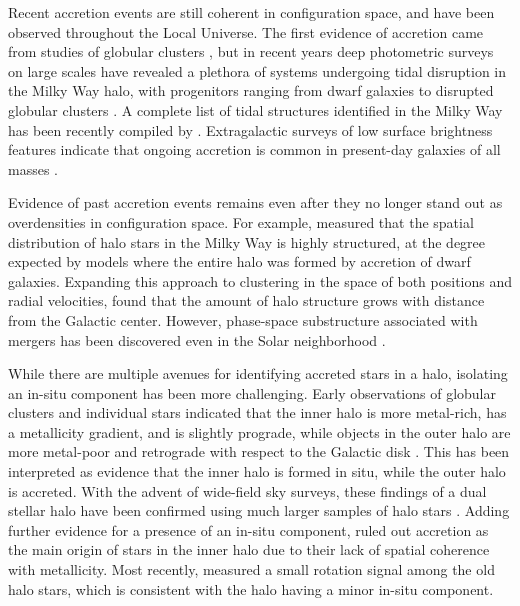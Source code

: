 \documentclass[apj, twocolappendix, numberedappendix, appendixfloats]{emulateapj}
\begin{document}
Recent accretion events are still coherent in configuration space, and have been observed throughout the Local Universe. 
The first evidence of accretion came from studies of globular clusters \citep{sz}, but in recent years deep photometric surveys on large scales have revealed a plethora of systems undergoing tidal disruption in the Milky Way halo, with progenitors ranging from dwarf galaxies \citep[e.g.,][]{ibata1994, belokurov2007a, belokurov2007b, juric2008, bonaca2012a} to disrupted globular clusters \citep[e.g.,][]{rockosi2002, grillmair2006, grillmair2009, bonaca2012b, bernard2016}.
A complete list of tidal structures identified in the Milky Way has been recently compiled by \citet{grillmair2016}.
Extragalactic surveys of low surface brightness features indicate that ongoing accretion is common in present-day galaxies of all masses \citep{ibata2001, ferguson2002, martinez-delgado2010, martinez-delgado2012, romanowsky2012, crnojevic2016}.

Evidence of past accretion events remains even after they no longer stand out as overdensities in configuration space.
For example, \citet{bell2008} measured that the spatial distribution of halo stars in the Milky Way is highly structured, at the degree expected by models where the entire halo was formed by accretion of dwarf galaxies.
Expanding this approach to clustering in the space of both positions and radial velocities, \citet{janesh2016} found that the amount of halo structure grows with distance from the Galactic center.
However, phase-space substructure associated with mergers has been discovered even in the Solar neighborhood \citep{helmi1999,smith2009,helmi2017}.

While there are multiple avenues for identifying accreted stars in a halo, isolating an in-situ component has been more challenging.
Early observations of globular clusters and individual stars indicated that the inner halo is more metal-rich, has a metallicity gradient, and is slightly prograde, while objects in the outer halo are more metal-poor and retrograde with respect to the Galactic disk \citep[e.g.,][]{sz}.
This has been interpreted as evidence that the inner halo is formed in situ, while the outer halo is accreted.
With the advent of wide-field sky surveys, these findings of a dual stellar halo have been confirmed using much larger samples of halo stars \citep{carollo2007, carollo2010, beers2012}.
Adding further evidence for a presence of an in-situ component, \citet{schlaufman2012} ruled out accretion as the main origin of stars in the inner halo due to their lack of spatial coherence with metallicity.
Most recently, \citet{deason2017} measured a small rotation signal among the old halo stars, which is consistent with the halo having a minor in-situ component.
\end{document}
